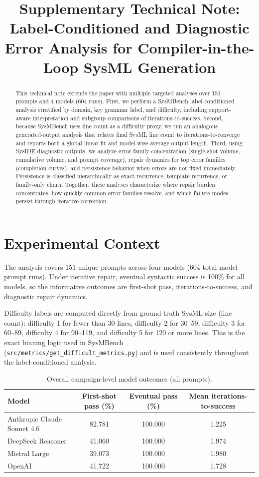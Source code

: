 \documentclass[11pt]{article}
\title{Supplementary Technical Note:\\Label-Conditioned and Diagnostic Error Analysis for Compiler-in-the-Loop SysML Generation}
\author{}
\date{}
\begin{document}
\maketitle

\begin{abstract}
This technical note extends the paper with multiple targeted analyses over 151 prompts and 4 models (604 runs). First, we perform a SysMBench label-conditioned analysis stratified by domain, key grammar label, and difficulty, including support-aware interpretation and subgroup comparisons of iterations-to-success. Second, because SysMBench uses line count as a difficulty proxy, we run an analogous generated-output analysis that relates final SysML line count to iterations-to-converge and reports both a global linear fit and model-wise average output length. Third, using SysIDE diagnostic outputs, we analyze error-family concentration (single-shot volume, cumulative volume, and prompt coverage), repair dynamics for top error families (completion curves), and persistence behavior when errors are not fixed immediately. Persistence is classified hierarchically as exact recurrence, template recurrence, or family-only churn. Together, these analyses characterize where repair burden concentrates, how quickly common error families resolve, and which failure modes persist through iterative correction.
\end{abstract}

\section{Experimental Context}
The analysis covers 151 unique prompts across four models (604 total model-prompt runs). Under iterative repair, eventual syntactic success is 100\% for all models, so the informative outcomes are first-shot pass, iterations-to-success, and diagnostic repair dynamics.

Difficulty labels are computed directly from ground-truth SysML size (line count): difficulty 1 for fewer than 30 lines, difficulty 2 for 30--59, difficulty 3 for 60--89, difficulty 4 for 90--119, and difficulty 5 for 120 or more lines. This is the exact binning logic used in SysMBench (\texttt{src/metrics/get\_difficult\_metrics.py}) and is used consistently throughout the label-conditioned analysis.

\begin{table}[h]
\centering
\caption{Overall campaign-level model outcomes (all prompts).}
\begin{tabular}{lccc}
\toprule
Model & First-shot pass (\%) & Eventual pass (\%) & Mean iterations-to-success \\
\midrule
Anthropic Claude Sonnet 4.6 & 82.781 & 100.000 & 1.225 \\
DeepSeek Reasoner & 41.060 & 100.000 & 1.974 \\
Mistral Large & 39.073 & 100.000 & 1.980 \\
OpenAI & 41.722 & 100.000 & 1.728 \\
\bottomrule
\end{tabular}
\end{table}
\end{document}
